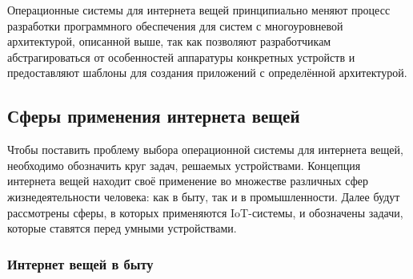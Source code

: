 Операционные системы для интернета вещей принципиально меняют процесс разработки программного обеспечения для систем с многоуровневой архитектурой, описанной выше, так как позволяют разработчикам абстрагироваться от особенностей аппаратуры конкретных устройств и предоставляют шаблоны для создания приложений с определённой архитектурой.








\subsection{Сферы применения интернета вещей}

Чтобы поставить проблему выбора операционной системы для интернета вещей, необходимо обозначить круг задач, решаемых устройствами. Концепция интернета вещей находит своё применение во множестве различных сфер жизнедеятельности человека: как в быту, так и в промышленности. Далее будут рассмотрены сферы, в которых применяются IoT-системы, и обозначены задачи, которые ставятся перед умными устройствами.

\subsubsection{Интернет вещей в быту}

